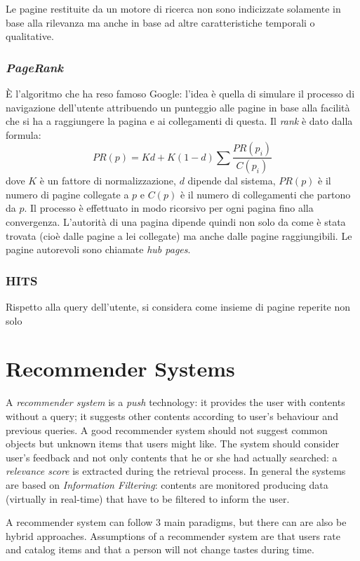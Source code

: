 \documentclass[11pt, a4page]{article}
\begin{document}
Le pagine restituite da un motore di ricerca non sono indicizzate solamente in base alla rilevanza ma anche in base ad altre caratteristiche temporali o qualitative.

\section{\textit{PageRank}}
È l'algoritmo che ha reso famoso Google: l'idea è quella di simulare il processo di navigazione dell'utente attribuendo un punteggio alle pagine in base alla facilità che si ha a raggiungere la pagina e ai collegamenti di questa.
Il \textit{rank} è dato dalla formula:
\begin{equation*}
  PR(p) = Kd + K(1 - d)\sum \frac{PR(p_i)}{C(p_i)}
\end{equation*}
dove $K$ è un fattore di normalizzazione, $d$ dipende dal sistema, $PR(p)$ è il numero di pagine collegate a $p$ e $C(p)$ è il numero di collegamenti che partono da $p$.
Il processo è effettuato in modo ricorsivo per ogni pagina fino alla convergenza.
L'autorità di una pagina dipende quindi non solo da come è stata trovata (cioè dalle pagine a lei collegate) ma anche dalle pagine raggiungibili.
Le pagine autorevoli sono chiamate \textit{hub pages}.

\section{HITS}
Rispetto alla query dell'utente, si considera come insieme di pagine reperite non solo

\newpage
\part{Recommender Systems}
A \textit{recommender system} is a \textit{push} technology: it provides the user with contents without a query; it suggests other contents according to user's behaviour and previous queries.
A good recommender system should not suggest common objects but unknown items that users might like.
The system should consider user's feedback and not only contents that he or she had actually searched: a \textit{relevance score} is extracted during the retrieval process.
In general the systems are based on \textit{Information Filtering}: contents are monitored producing data (virtually in real-time) that have to be filtered to inform the user.

A recommender system can follow 3 main paradigms, but there can are also be hybrid approaches.
Assumptions of a recommender system are that users rate and catalog items and that a person will not change tastes during time.
\end{document}

